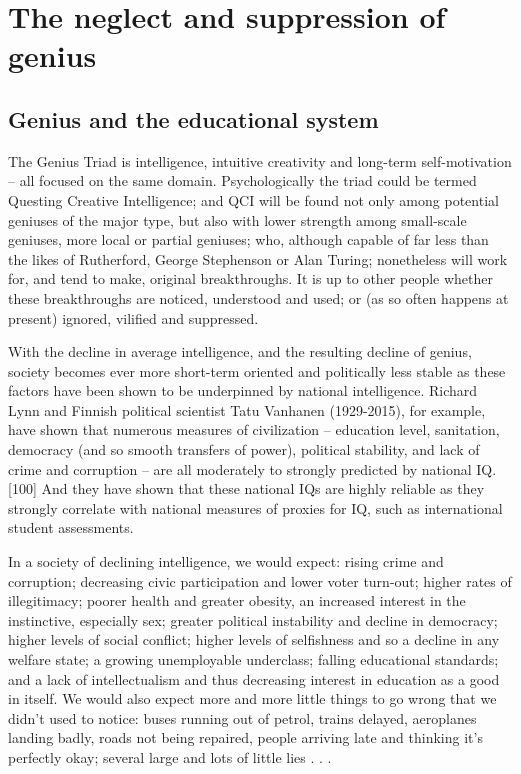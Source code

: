 \documentclass[
]{book}
\begin{document}
\hypertarget{the-neglect-and-suppression-of-genius}{%
\chapter{The neglect and suppression of genius}\label{the-neglect-and-suppression-of-genius}}

\hypertarget{genius-and-the-educational-system}{%
\section{Genius and the educational system}\label{genius-and-the-educational-system}}

The Genius Triad is intelligence, intuitive creativity and long-term self-motivation -- all focused on the same domain. Psychologically the triad could be termed Questing Creative Intelligence; and QCI will be found not only among potential geniuses of the major type, but also with lower strength among small-scale geniuses, more local or partial geniuses; who, although capable of far less than the likes of Rutherford, George Stephenson or Alan Turing; nonetheless will work for, and tend to make, original breakthroughs. It is up to other people whether these breakthroughs are noticed, understood and used; or (as so often happens at present) ignored, vilified and suppressed.

With the decline in average intelligence, and the resulting decline of genius, society becomes ever more short-term oriented and politically less stable as these factors have been shown to be underpinned by national intelligence. Richard Lynn and Finnish political scientist Tatu Vanhanen (1929-2015), for example, have shown that numerous measures of civilization -- education level, sanitation, democracy (and so smooth transfers of power), political stability, and lack of crime and corruption -- are all moderately to strongly predicted by national IQ.{[}100{]} And they have shown that these national IQs are highly reliable as they strongly correlate with national measures of proxies for IQ, such as international student assessments.

In a society of declining intelligence, we would expect: rising crime and corruption; decreasing civic participation and lower voter turn-out; higher rates of illegitimacy; poorer health and greater obesity, an increased interest in the instinctive, especially sex; greater political instability and decline in democracy; higher levels of social conflict; higher levels of selfishness and so a decline in any welfare state; a growing unemployable underclass; falling educational standards; and a lack of intellectualism and thus decreasing interest in education as a good in itself. We would also expect more and more little things to go wrong that we didn't used to notice: buses running out of petrol, trains delayed, aeroplanes landing badly, roads not being repaired, people arriving late and thinking it's perfectly okay; several large and lots of little lies . . .
\end{document}
